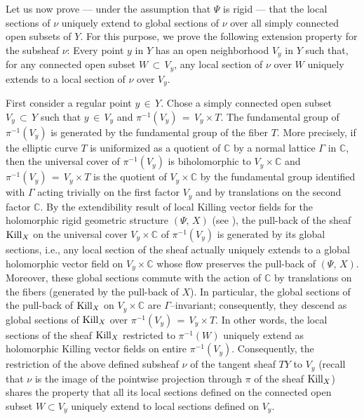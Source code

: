 \documentclass[12pt,reqno]{amsart}
\theoremstyle{definition}
\numberwithin{equation}{section}
\begin{document}
Let us now prove --- under the assumption that $\Psi$ is rigid --- that the local sections of $\nu$ 
uniquely extend to global sections of $\nu$ over all simply connected open subsets of $Y$. For this 
purpose, we prove the following extension property for the subsheaf $\nu$: Every point $y$ in $Y$ has an open 
neighborhood $V_y$ in $Y$ such that, for any connected open subset $W \,\subset\, V_y$, any local section of 
$\nu$ over $W$ uniquely extends to a local section of $\nu$ over $V_y$.

First consider a regular point $y \,\in\, Y$. Chose a simply connected open subset $V_y\, \subset\, Y$ such 
that $y \,\in\, V_y$ and $\pi^{-1}(V_y)\,=\, V_y \times T$. The fundamental group of $\pi^{-1}(V_y)$ is 
generated by the fundamental group of the fiber $T$. More precisely, if the elliptic curve $T$ is 
uniformized as a quotient of $\mathbb C$ by a normal lattice $\Gamma$ in $\mathbb C$, then the universal 
cover of $\pi^{-1}(V_y)$ is biholomorphic to $V_y \times \mathbb C$ and $\pi^{-1}(V_y)\,=\, V_y \times T$ is 
the quotient of $V_y \times \mathbb C$ by the fundamental group identified with $\Gamma$ acting trivially on 
the first factor $V_y$ and by translations on the second factor $\mathbb C$. By the extendibility result of 
local Killing vector fields for the holomorphic rigid geometric structure $(\Psi,\,X)$ (see \cite{Am, 
Gr,DG,No}), the pull-back of the sheaf ${\rm Kill}_X$ on the universal cover $V_y \times \mathbb C$ of 
$\pi^{-1}(V_y)$ is generated by its global sections, i.e., any local section of the sheaf actually uniquely 
extends to a global holomorphic vector field on $V_y \times \mathbb C$ whose flow preserves the pull-back of 
$(\Psi,\, X)$. Moreover, these global sections commute with the action of $\mathbb C$ by translations on the 
fibers (generated by the pull-back of $X$). In particular, the global sections of the pull-back of ${\rm 
Kill}_X$ on $V_y \times \mathbb C$ are $\Gamma$--invariant; consequently, they descend as global sections of 
${\rm Kill}_X$ over $\pi^{-1}(V_y)\,=\, V_y \times T$. In other words, the local sections of the sheaf ${\rm 
Kill}_X$ restricted to $\pi^{-1}(W)$ uniquely extend as holomorphic Killing vector fields on entire 
$\pi^{-1}(V_y)$. Consequently, the restriction of the above defined subsheaf $\nu$ of the tangent sheaf $TY$ 
to $V_y$ (recall that $\nu$ is the image of the pointwise projection through $\pi$ of the sheaf ${\rm 
Kill}_X$) shares the property that all its local sections defined on the connected open subset $W \subset 
V_y$ uniquely extend to local sections defined on $V_y$.
\end{document}
